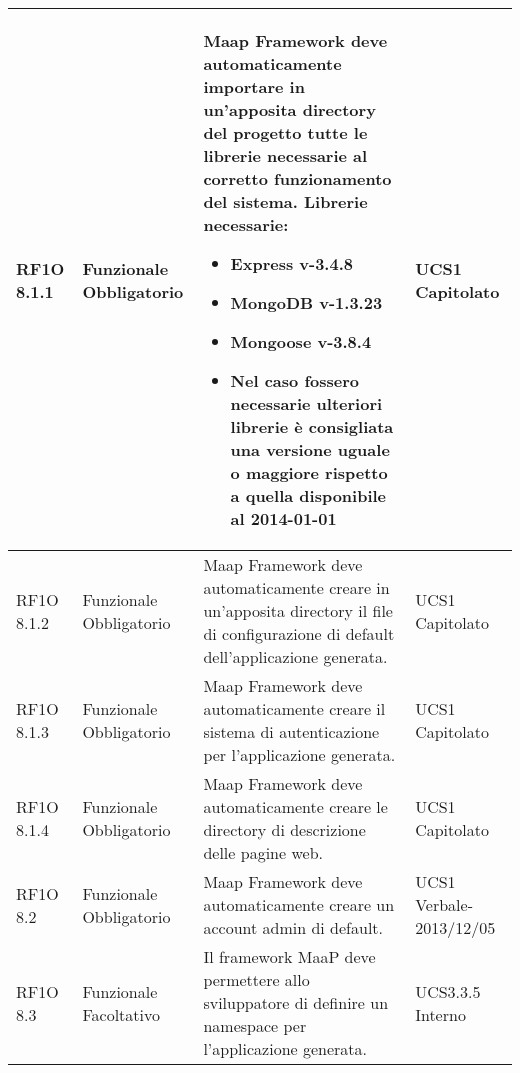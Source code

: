 \begin{center}
\begin{longtable}{ | l | p{2cm} | p{5cm} | p{1.7cm} |}
        RF1O 8.1.1  & Funzionale \newline  Obbligatorio  & Maap Framework deve automaticamente importare in un'apposita directory del progetto tutte le librerie necessarie al corretto funzionamento del sistema.
Librerie necessarie:
\begin{itemize}
\item Express v-3.4.8
\item MongoDB v-1.3.23
\item Mongoose v-3.8.4
\item Nel caso fossero necessarie ulteriori librerie è consigliata una versione uguale o maggiore rispetto a quella disponibile al 2014-01-01
\end{itemize}
 &  UCS1 \newline  Capitolato \newline  \\ \hline      
        RF1O 8.1.2 & Funzionale \newline  Obbligatorio  & Maap Framework deve automaticamente creare in un'apposita directory il file di configurazione di default dell'applicazione generata.
 &  UCS1 \newline  Capitolato \newline  \\ \hline      
        RF1O 8.1.3  & Funzionale \newline  Obbligatorio  & Maap Framework deve automaticamente creare il sistema di autenticazione per l'applicazione generata. &  UCS1 \newline  Capitolato \newline  \\ \hline      
        RF1O 8.1.4  & Funzionale \newline  Obbligatorio  & Maap Framework deve automaticamente creare le directory di descrizione delle pagine web.
 &  UCS1 \newline  Capitolato \newline  \\ \hline      
        RF1O 8.2  & Funzionale \newline  Obbligatorio  & Maap Framework deve automaticamente creare un account admin di default. &  UCS1 \newline  Verbale-2013/12/05 \newline  \\ \hline      
        RF1O 8.3 & Funzionale \newline  Facoltativo  & Il framework MaaP deve permettere allo sviluppatore di definire un namespace per l'applicazione generata. &  UCS3.3.5 \newline  Interno \newline  \\ \hline      

\end{longtable}
\end{center}
